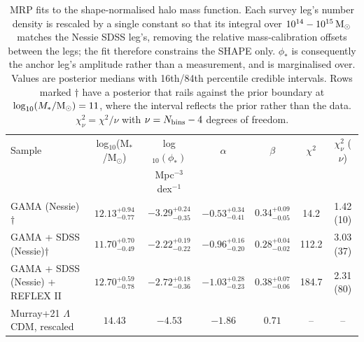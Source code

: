\begin{table}
\centering
\caption{MRP fits to the shape-normalised halo mass function.  Each survey leg's number density is rescaled by a single constant so that its integral over $10^{14}-10^{15}\,{\rm M}_\odot$ matches the Nessie SDSS leg's, removing the relative mass-calibration offsets between the legs; the fit therefore constrains the SHAPE only.  $\phi_*$ is consequently the anchor leg's amplitude rather than a measurement, and is marginalised over.  Values are posterior medians with 16th/84th percentile credible intervals.  Rows marked $\dagger$ have a posterior that rails against the prior boundary at $\log_{10}(M_*/{\rm M}_\odot) = 11$, where the interval reflects the prior rather than the data.  $\chi^2_\nu = \chi^2/\nu$ with $\nu = N_{\rm bins} - 4$ degrees of freedom.}
\begin{tabular}{lcccccc}
\hline
Sample & log$_{10}$(M$_*$/M$_\odot$) & log$_{10}(\phi_*)$ & $\alpha$ & $\beta$ & $\chi^2$ & $\chi^2_\nu$ ($\nu$) \\
 & & Mpc$^{-3}$ dex$^{-1}$ & & & & \\
\hline
GAMA (Nessie)$\dagger$ & $12.13^{+0.94}_{-0.77}$ & $-3.29^{+0.24}_{-0.35}$ & $-0.53^{+0.34}_{-0.41}$ & $0.34^{+0.09}_{-0.05}$ & 14.2 & 1.42 (10) \\
GAMA + SDSS (Nessie)$\dagger$ & $11.70^{+0.70}_{-0.49}$ & $-2.22^{+0.19}_{-0.22}$ & $-0.96^{+0.16}_{-0.20}$ & $0.28^{+0.04}_{-0.02}$ & 112.2 & 3.03 (37) \\
GAMA + SDSS (Nessie) + REFLEX II & $12.70^{+0.59}_{-0.78}$ & $-2.72^{+0.18}_{-0.36}$ & $-1.03^{+0.28}_{-0.23}$ & $0.38^{+0.07}_{-0.06}$ & 184.7 & 2.31 (80) \\
\hline
Murray+21 $\Lambda$CDM, rescaled & $14.43$ & $-4.53$ & $-1.86$ & $0.71$ & -- & -- \\
\hline
\end{tabular}
\label{tab:mrp_shape}
\end{table}
